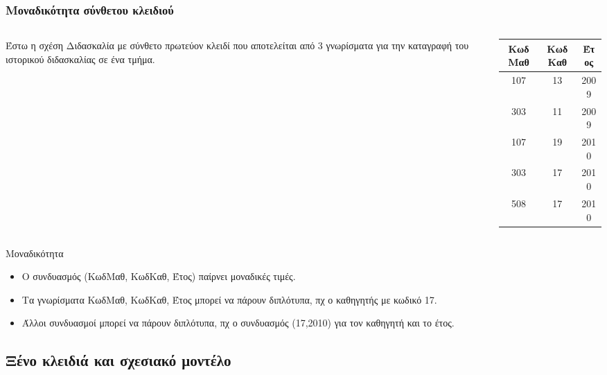 \begin{frame}
\frametitle{Μοναδικότητα σύνθετου κλειδιού}
\begin{minipage}{0.94\textwidth}
  \begin{columns}[T]
    \begin{column}{0.5\textwidth}
      Έστω η σχέση Διδασκαλία με σύνθετο πρωτεύον κλειδί που αποτελείται από 3 γνωρίσματα για την καταγραφή του
      ιστορικού διδασκαλίας σε ένα τμήμα. 
    \end{column}
    \begin{column}{0.5\textwidth}
      \begin{tabular}{c c c} \toprule
        {\bf ΚωδΜαθ} & {\bf ΚωδΚαθ} & {\bf Έτος} \\ \midrule
        107 & 13 & 2009 \\ 
        303 & 11 & 2009 \\
        107 & 19 & 2010 \\
        303 & 17 & 2010 \\
        508 & 17 & 2010 \\    \bottomrule
      \end{tabular}      
    \end{column}  
  \end{columns}
  \begin{block}{Μοναδικότητα}
    \begin{itemize}
      \item Ο συνδυασμός (ΚωδΜαθ, ΚωδΚαθ, Έτος) παίρνει μοναδικές τιμές.
      \item Τα γνωρίσματα ΚωδΜαθ, ΚωδΚαθ, Έτος μπορεί να πάρουν διπλότυπα, πχ ο καθηγητής με κωδικό 17.
      \item Άλλοι συνδυασμοί μπορεί να πάρουν διπλότυπα, πχ ο συνδυασμός (17,2010) για τον καθηγητή και το έτος.
    \end{itemize}
  \end{block}
  
\end{minipage} 
\end{frame}




\subsection[\textgreek{Ξένο κλειδί}] {\textgreek {Ξένο κλειδιά και σχεσιακό μοντέλο} }


